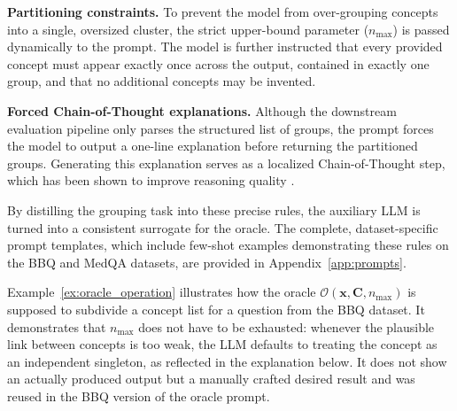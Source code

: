 \noindent\textbf{Partitioning constraints.} To prevent the model from over-grouping concepts into a single, oversized cluster, the strict upper-bound parameter ($n_{\max}$) is passed dynamically to the prompt. The model is further instructed that every provided concept must appear exactly once across the output, contained in exactly one group, and that no additional concepts may be invented.

\noindent\textbf{Forced Chain-of-Thought explanations.} Although the downstream evaluation pipeline only parses the structured list of groups, the prompt forces the model to output a one-line explanation before returning the partitioned groups. Generating this explanation serves as a localized Chain-of-Thought step, which has been shown to improve reasoning quality \cite{weiChainofthoughtPromptingElicits2022}.

By distilling the grouping task into these precise rules, the auxiliary LLM is turned into a consistent surrogate for the oracle. The complete, dataset-specific prompt templates, which include few-shot examples demonstrating these rules on the BBQ and MedQA datasets, are provided in Appendix~\ref{app:prompts}.

Example~\ref{ex:oracle_operation} illustrates how the oracle $\mathcal{O}(\mathbf{x}, \mathbf{C}, n_{\max})$ is supposed to subdivide a concept list for a question from the BBQ dataset. It demonstrates that $n_{\max}$ does not have to be exhausted: whenever the plausible link between concepts is too weak, the LLM defaults to treating the concept as an independent singleton, as reflected in the explanation below. It does not show an actually produced output but a manually crafted desired result and was reused in the BBQ version of the oracle prompt.


